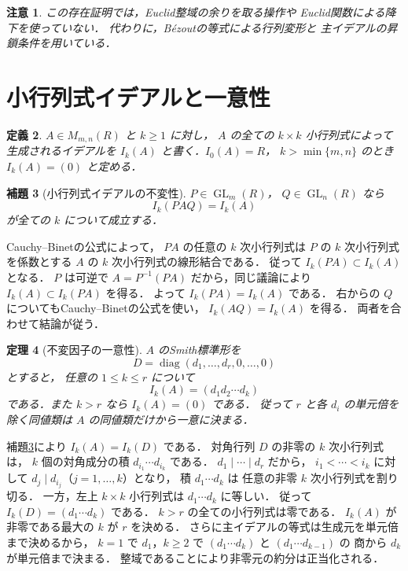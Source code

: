 \documentclass[a5paper,10pt,onecolumn]{jsarticle}
\makeatletter
\theoremstyle{mathnotetheorem}
\newtheorem{theorem}{定理}[section]
\newtheorem{definition}[theorem]{定義}
\newtheorem{lemma}[theorem]{補題}
\newtheorem{remark}[theorem]{注意}
\renewcommand{\proofname}{証明}
\renewenvironment{proof}[1][\proofname]{%
  \par\pushQED{\qed}\normalfont\topsep4\p@\@plus2\p@\relax
  \trivlist\item[\hskip\labelsep\bfseries #1]\ignorespaces
}{\popQED\endtrivlist\@endpefalse}
\makeatother
\begin{document}
\begin{remark}
この存在証明では，Euclid整域の余りを取る操作や
Euclid関数による降下を使っていない．
代わりに，B\'ezoutの等式による行列変形と
主イデアルの昇鎖条件を用いている．
\end{remark}

\section{小行列式イデアルと一意性}

\begin{definition}
$A\in M_{m,n}(R)$ と $k\ge1$ に対し，
$A$ の全ての $k\times k$ 小行列式によって生成されるイデアルを
$I_k(A)$ と書く．$I_0(A)=R$，
$k>\min\{m,n\}$ のとき $I_k(A)=(0)$ と定める．
\end{definition}

\begin{lemma}[小行列式イデアルの不変性]\label{lem:minor-invariant}
$P\in\operatorname{GL}_m(R)$，
$Q\in\operatorname{GL}_n(R)$ なら
\[
 I_k(PAQ)=I_k(A)
\]
が全ての $k$ について成立する．
\end{lemma}
\begin{proof}
Cauchy--Binetの公式によって，
$PA$ の任意の $k$ 次小行列式は
$P$ の $k$ 次小行列式を係数とする
$A$ の $k$ 次小行列式の線形結合である．
従って $I_k(PA)\subset I_k(A)$ となる．
$P$ は可逆で $A=P^{-1}(PA)$ だから，同じ議論により
$I_k(A)\subset I_k(PA)$ を得る．
よって $I_k(PA)=I_k(A)$ である．
右からの $Q$ についてもCauchy--Binetの公式を使い，
$I_k(AQ)=I_k(A)$ を得る．
両者を合わせて結論が従う．
\end{proof}

\begin{theorem}[不変因子の一意性]\label{thm:smith-unique}
$A$ のSmith標準形を
\[
 D=\operatorname{diag}(d_1,\dots,d_r,0,\dots,0)
\]
とすると，
任意の $1\le k\le r$ について
\[
 I_k(A)=(d_1d_2\cdots d_k)
\]
である．また $k>r$ なら $I_k(A)=(0)$ である．
従って $r$ と各 $d_i$ の単元倍を除く同値類は
$A$ の同値類だけから一意に決まる．
\end{theorem}
\begin{proof}
補題\ref{lem:minor-invariant}により
$I_k(A)=I_k(D)$ である．
対角行列 $D$ の非零の $k$ 次小行列式は，
$k$ 個の対角成分の積
$d_{i_1}\cdots d_{i_k}$ である．
$d_1\mid\cdots\mid d_r$ だから，
$i_1<\cdots<i_k$ に対して
$d_j\mid d_{i_j}$（$j=1,\dots,k$）となり，
積 $d_1\cdots d_k$ は
任意の非零 $k$ 次小行列式を割り切る．
一方，左上 $k\times k$ 小行列式は
$d_1\cdots d_k$ に等しい．
従って $I_k(D)=(d_1\cdots d_k)$ である．
$k>r$ の全ての小行列式は零である．
$I_k(A)$ が非零である最大の $k$ が $r$ を決める．
さらに主イデアルの等式は生成元を単元倍まで決めるから，
$k=1$ で $d_1$，$k\ge2$ で
$(d_1\cdots d_k)$ と $(d_1\cdots d_{k-1})$ の
商から $d_k$ が単元倍まで決まる．
整域であることにより非零元の約分は正当化される．
\end{proof}
\end{document}
